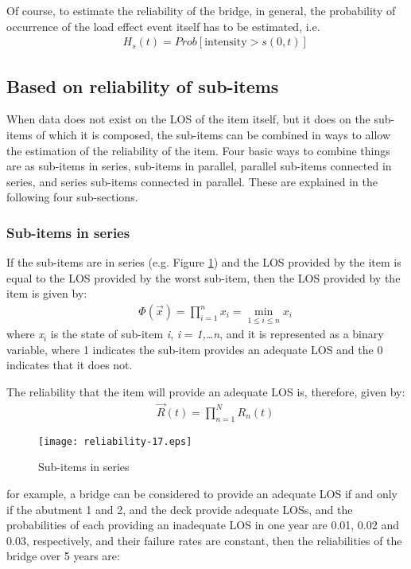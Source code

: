 Of course, to estimate the reliability of the bridge, in general, the probability of occurrence of the load effect event itself has to be estimated, i.e.
\begin{eqnarray}
&& H_s(t)=Prob\left[\text{intensity} > s(0,t) \right] \label{eqreliability:14}
\end{eqnarray}
\subsection{Based on reliability of sub-items}
When data does not exist on the LOS of the item itself, but it does on the
sub-items of which it is composed, the sub-items can be combined in ways to allow
the estimation of the reliability of the item. Four basic ways to combine things
are as sub-items in series, sub-items in parallel, parallel sub-items connected
in series, and series sub-items connected in parallel. These are explained in the
following four sub-sections.
\subsubsection{Sub-items in series}
If the sub-items are in series (e.g. Figure \ref{reliability-17}) and the LOS provided
by the item is equal to the LOS provided by the worst sub-item, then the LOS
provided by the item is given by:
\begin{eqnarray}
&& \Phi(\overrightarrow{x})=\prod_{i=1}^n x_i= \min\limits_{1 \leq i \leq n} x_i \label{eqreliability:15}
\end{eqnarray}
where \textit{x$_{i}$} is the state of sub-item \textit{i}, \textit{i} =
\textit{1,\ldots{}n}, and it is represented as a binary variable, where 1
indicates the sub-item provides an adequate LOS and the 0 indicates that it does
not.

The reliability that the item will provide an adequate LOS is, therefore, given by:
\begin{eqnarray}
&& \vec R(t) = \prod\limits_{n = 1}^N {{R_n}(t)}
\label{eqreliability:17}
\end{eqnarray}

\begin{figure}[h]
\texttt{[image: reliability-17.eps]}
\caption{Sub-items in series}\label{reliability-17}
\end{figure}
for example, a bridge can be considered to provide an adequate LOS if and only
if the abutment 1 and 2, and the deck provide adequate LOSs, and the probabilities
of each providing an inadequate LOS in one year are 0.01, 0.02 and 0.03,
respectively, and their failure rates are constant, then the reliabilities of the
bridge over 5 years are:

